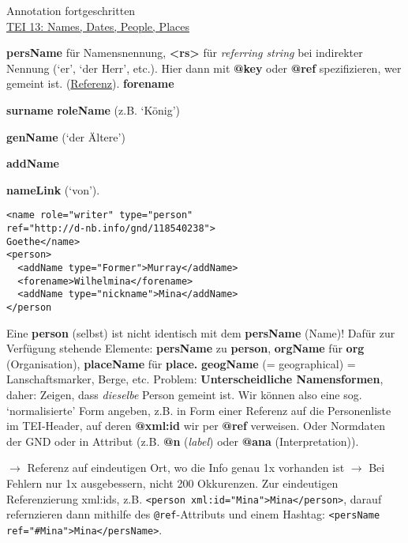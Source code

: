 \begin{frame}{Annotation fortgeschritten}
\footnotesize
{}\\
\href{http://www.tei-c.org/release/doc/tei-p5-doc/en/html/ND.html}{TEI 13: Names, Dates, People, Places} \item 
\textbf{persName} für Namensnennung, \textbf{<rs>} für \emph{referring string} bei indirekter Nennung (`er', `der Herr', etc.). Hier dann mit \textbf{@key} oder \textbf{@ref} spezifizieren, wer gemeint ist. (\href{http://www.tei-c.org/release/doc/tei-p5-doc/en/html/CO.html#CONARS}{Referenz}). \textbf{forename} \item \textbf{surname} \seo \textbf{roleName} (z.B. `König') \item  \textbf{genName} (`der Ältere') \item \textbf{addName} \item \textbf{nameLink} (`von').

\begin{verbatim}
<name role="writer" type="person"
ref="http://d-nb.info/gnd/118540238">
Goethe</name>
<person>
  <addName type="Former">Murray</addName>
  <forename>Wilhelmina</forename>
  <addName type="nickname">Mina</addName>
</person
\end{verbatim}

Eine \textbf{person} (selbst) ist nicht identisch mit dem \textbf{persName} (Name)! Dafür zur Verfügung stehende Elemente: \textbf{persName} zu \textbf{person}, \textbf{orgName} für \textbf{org} (Organisation), \textbf{placeName} für \textbf{place.} \textbf{geogName} (= geographical) = Lanschaftsmarker, Berge, etc.
Problem: \textbf{Unterscheidliche Namensformen}, daher:
 Zeigen, dass \emph{dieselbe} Person gemeint ist. Wir können also eine sog. `normalisierte' Form angeben, z.B. in Form einer Referenz auf die Personenliste im TEI-Header, auf deren \textbf{@xml:id} wir per \textbf{@ref} verweisen. Oder Normdaten der GND oder in Attribut (z.B. \textbf{@n} (\emph{label}) oder \textbf{@ana} (Interpretation)). 

 $\to$ Referenz auf eindeutigen Ort, wo die Info genau 1x vorhanden ist $\to$ Bei Fehlern nur 1x ausgebessern, nicht 200 Okkurenzen. Zur eindeutigen Referenzierung xml:ids, z.B. \verb|<person xml:id="Mina">Mina</person>|, darauf refernzieren dann mithilfe des \texttt{@ref}-Attributs und einem Hashtag: \verb|<persName ref="#Mina">Mina</persName>|.

\end{frame}
